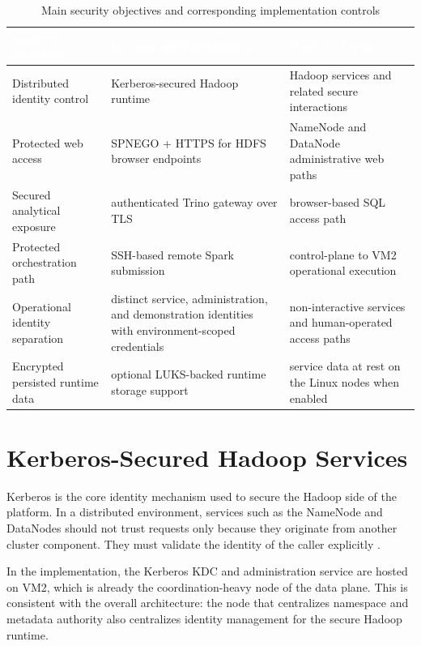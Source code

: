 \begin{table}[!htbp]
    \centering
    \footnotesize
    \renewcommand{\arraystretch}{1.16}
    \begin{tabularx}{\textwidth}{|Y|Y|Y|}
        \hline
        \textcolor{white}{\textbf{Security objective}} & \textcolor{white}{\textbf{Implemented mechanism}} & \textcolor{white}{\textbf{Protected scope}} \\
        \hline
        Distributed identity control & Kerberos-secured Hadoop runtime & Hadoop services and related secure interactions \\
        \hline
        Protected web access & SPNEGO + HTTPS for HDFS browser endpoints & NameNode and DataNode administrative web paths \\
        \hline
        Secured analytical exposure & authenticated Trino gateway over TLS & browser-based SQL access path \\
        \hline
        Protected orchestration path & SSH-based remote Spark submission & control-plane to VM2 operational execution \\
        \hline
        Operational identity separation & distinct service, administration, and demonstration identities with environment-scoped credentials & non-interactive services and human-operated access paths \\
        \hline
        Encrypted persisted runtime data & optional LUKS-backed runtime storage support & service data at rest on the Linux nodes when enabled \\
        \hline
    \end{tabularx}
    \caption{Main security objectives and corresponding implementation controls}
    \label{tab:chapter7-security-objectives}
\end{table}
\FloatBarrier

\section{Kerberos-Secured Hadoop Services}
Kerberos is the core identity mechanism used to secure the Hadoop side of the platform. In a distributed environment, services such as the NameNode and DataNodes should not trust requests only because they originate from another cluster component. They must validate the identity of the caller explicitly \cite{mit_kerberos_docs,apache_hadoop_docs}.

In the implementation, the Kerberos KDC and administration service are hosted on VM2, which is already the coordination-heavy node of the data plane. This is consistent with the overall architecture: the node that centralizes namespace and metadata authority also centralizes identity management for the secure Hadoop runtime.

